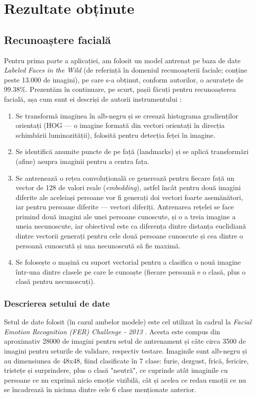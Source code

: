 \documentclass{article}
\begin{document}
\section{Rezultate obținute}

\subsection{Recunoaștere facială}
Pentru prima parte a aplicației, am folosit un model \cite{login} antrenat pe baza de date \textit{Labeled Faces in the Wild} (de referință în domeniul recunoașterii faciale; conține peste 13.000 de imagini), pe care s-a obținut, conform autorilor, o acuratețe de 99.38\%. Prezentăm în continuare, pe scurt, pașii făcuți pentru recunoașterea facială, așa cum sunt ei descriși de autorii instrumentului \cite{logintool}:
\begin{enumerate}
\item Se transformă imaginea în alb-negru și se creează histograma gradienților orientați (HOG --- o imagine formată din vectori orientați în direcția schimbării luminozității), folosită pentru detecția feței în imagine.
\item Se identifică anumite puncte de pe față (landmarks) și se aplică transformări (afine) asupra imaginii pentru a centra fața.
\item Se antrenează o rețea convoluțională ce generează pentru fiecare față un vector de 128 de valori reale (\textit{embedding}), astfel încât pentru două imagini diferite ale aceleiași persoane vor fi generați doi vectori foarte asemănători, iar pentru persoane diferite --- vectori diferiți. Antrenarea rețelei se face primind două imagini ale unei persoane cunoscute, și o a treia imagine a uneia necunoscute, iar obiectivul este ca diferența dintre distanța euclidiană dintre vectorii generați pentru cele două persoane cunoscute și cea dintre o persoană cunoscută și una necunoscută să fie maximă.
\item Se folosește o mașină cu suport vectorial pentru a clasifica o nouă imagine într-una dintre clasele pe care le cunoaște (fiecare persoană e o clasă, plus o clasă pentru necunoscuți).
\end{enumerate}

\subsubsection{Descrierea setului de date}
Setul de date folosit (în cazul ambelor modele) este cel utilizat în cadrul la \textit{Facial Emotion Recognition (FER) Challenge - 2013} \cite{datasetlink}. Acesta este compus din aproximativ 28000 de imagini pentru setul de antrenament și câte circa 3500 de imagini pentru seturile de validare, respectiv testare. Imaginile sunt alb-negru și au dimensiunea de 48x48, fiind clasificate în 7 clase: furie, dezgust, frică, fericire, tristețe și surprindere, plus o clasă "neutră", ce cuprinde atât imaginile cu persoane ce nu exprimă nicio emoție vizibilă, cât și acelea ce redau emoții ce nu se încadrează în niciuna dintre cele 6 clase menționate anterior. 
\end{document}
